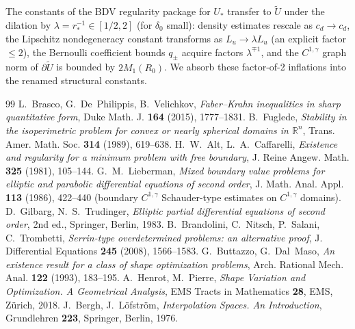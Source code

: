 \documentclass[11pt]{amsart}
\newcommand{\R}{\mathbb R}
\newcommand{\wt}{\widetilde}
\begin{document}
The constants of the BDV regularity package for \(U_*\) transfer to
\(\wt U\) under the dilation by \(\lambda=r_*^{-1}\in[1/2,2]\) (for
\(\delta_0\) small): density estimates rescale as \(c_d\to c_d\), the
Lipschitz nondegeneracy constant transforms as \(L_u\to\lambda L_u\)
(an explicit factor \(\le 2\)), the Bernoulli coefficient bounds
\(q_\pm\) acquire factors \(\lambda^{\mp 1}\), and the
\(C^{1,\gamma}\) graph norm of \(\partial\wt U\) is bounded by
\(2M_1(R_0)\).  We absorb these factor-of-2 inflations into the
renamed structural constants.

\begin{thebibliography}{99}
 L.~Brasco, G.~De~Philippis, B.~Velichkov,
\emph{Faber--Krahn inequalities in sharp quantitative form},
Duke Math. J. \textbf{164} (2015), 1777--1831.
 B.~Fuglede, \emph{Stability in the isoperimetric problem for convex or nearly spherical domains in $\R^n$}, Trans. Amer. Math. Soc. \textbf{314} (1989), 619--638.
 H.~W.~Alt, L.~A.~Caffarelli,
\emph{Existence and regularity for a minimum problem with free
boundary}, J. Reine Angew. Math. \textbf{325} (1981), 105--144.
 G.~M.~Lieberman,
\emph{Mixed boundary value problems for elliptic and parabolic
differential equations of second order},
J. Math. Anal. Appl. \textbf{113} (1986), 422--440 (boundary
$C^{1,\gamma}$ Schauder-type estimates on $C^{1,\gamma}$ domains).
 D.~Gilbarg, N.~S.~Trudinger,
\emph{Elliptic partial differential equations of second order},
2nd ed., Springer, Berlin, 1983.
 B.~Brandolini, C.~Nitsch, P.~Salani, C.~Trombetti,
\emph{Serrin-type overdetermined problems: an alternative proof},
J. Differential Equations \textbf{245} (2008), 1566--1583.
 G.~Buttazzo, G.~Dal~Maso,
\emph{An existence result for a class of shape optimization problems},
Arch. Rational Mech. Anal. \textbf{122} (1993), 183--195.
 A.~Henrot, M.~Pierre,
\emph{Shape Variation and Optimization. A Geometrical Analysis},
EMS Tracts in Mathematics \textbf{28}, EMS, Z\"urich, 2018.
 J.~Bergh, J.~L\"ofstr\"om,
\emph{Interpolation Spaces. An Introduction},
Grundlehren \textbf{223}, Springer, Berlin, 1976.
\end{thebibliography}
\end{document}
